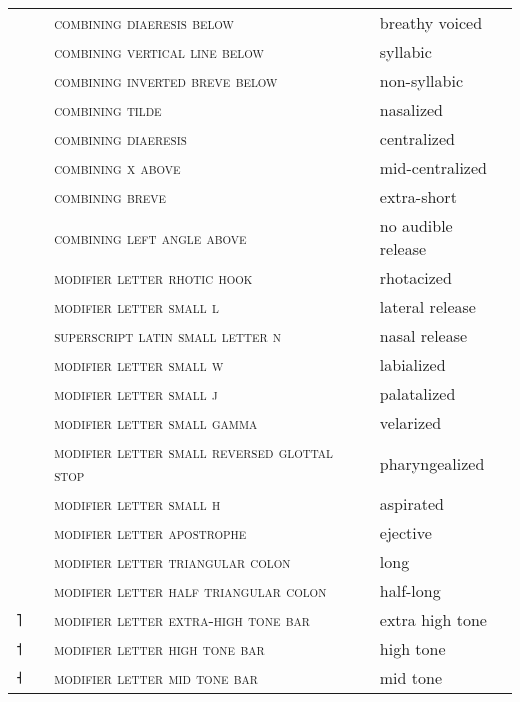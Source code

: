\begin{center}
\begin{xtabular}{ l L{1.2cm} L{6.6cm} L{3cm} }
 &  & \textsc{combining diaeresis below} & breathy voiced \\
 &  & \textsc{combining vertical line below} & syllabic \\
 &  & \textsc{combining inverted breve below} & non-syllabic \\
 &  & \textsc{combining tilde} & nasalized \\
 &  & \textsc{combining diaeresis} & centralized \\
 &  & \textsc{combining x above} & mid-centralized \\
 &  & \textsc{combining breve} & extra-short \\
 &  & \textsc{combining left angle above} & no audible release \\
 &  & \textsc{modifier letter rhotic hook} & rhotacized \\
 &  & \textsc{modifier letter small l} & lateral release \\
 &  & \textsc{superscript latin small letter n} & nasal release \\
 &  & \textsc{modifier letter small w} & labialized \\
 &  & \textsc{modifier letter small j} & palatalized \\
 &  & \textsc{modifier letter small gamma} & velarized \\
 &  & \textsc{modifier letter small reversed glottal stop} & pharyngealized \\
 &  & \textsc{modifier letter small h} & aspirated \\
 &  & \textsc{modifier letter apostrophe} & ejective \\
 &  & \textsc{modifier letter triangular colon} & long \\
 &  & \textsc{modifier letter half triangular colon} & half-long \\{˥} &  & \textsc{modifier letter extra-high tone bar} & extra high tone \\
{˦} &  & \textsc{modifier letter high tone bar} & high tone \\
{˧} &  & \textsc{modifier letter mid tone bar} & mid tone \\

\end{xtabular}
\end{center}
